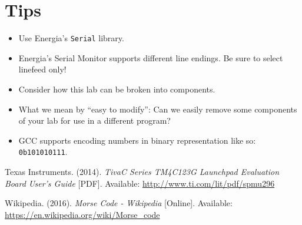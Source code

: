 \documentclass{article}
\begin{document}
\section*{Tips}
\begin{itemize}
	\item Use Energia's \texttt{Serial} library.
	\item Energia's Serial Monitor supports different line endings.  Be sure to select linefeed only!
	\item Consider how this lab can be broken into components.
	\item What we mean by ``easy to modify'': Can we easily remove some components of your lab for use in a different program?
	\item GCC supports encoding numbers in binary representation like so: \texttt{0b101010111}.
\end{itemize}

\begin{flushleft}
\begin{thebibliography}{1}

	Texas Instruments.
	(2014).
	\emph{Tiva\texttrademark C Series TM4C123G Launchpad Evaluation Board User's Guide} [PDF].
	Available: \url{http://www.ti.com/lit/pdf/spmu296}

	Wikipedia.
	(2016).
	\emph{Morse Code - Wikipedia} [Online].
	Available: \url{https://en.wikipedia.org/wiki/Morse_code}

\end{thebibliography}
\end{flushleft}
\end{document}
